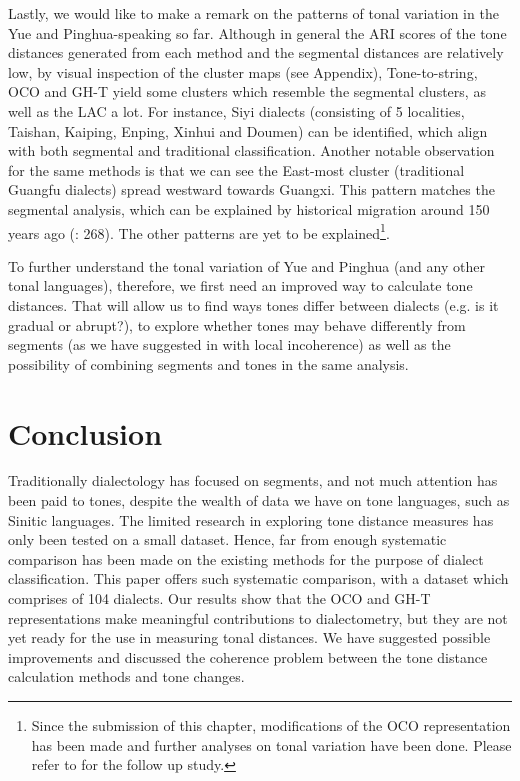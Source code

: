\documentclass[output=paper, chinesefont]{langscibook}
\begin{document}
Lastly, we would like to make a remark on the patterns of tonal variation in the Yue and Pinghua-speaking so far. Although in general the ARI scores of the tone distances generated from each method and the segmental distances are relatively low, by visual inspection of the cluster maps (see Appendix), Tone-to-string, OCO and GH-T yield some clusters which resemble the segmental clusters, as well as the LAC a lot. For instance, Siyi dialects (consisting of 5 localities, Taishan, Kaiping, Enping, Xinhui and Doumen) can be identified, which align with both segmental and traditional classification. Another notable observation for the same methods is that we can see the East-most cluster (traditional Guangfu dialects) spread westward towards Guangxi. This pattern matches the segmental analysis, which can be explained by historical migration around 150 years ago (\citealt{Sousa2022}: 268). The other patterns are yet to be explained\footnote{Since the submission of this chapter, modifications of the OCO representation has been made and further analyses on tonal variation have been done. Please refer to \citet{sung2024exploring} for the follow up study.}.

To further understand the tonal variation of Yue and Pinghua (and any other tonal languages), therefore, we first need an improved way to calculate tone distances. That will allow us to find ways tones differ between dialects (e.g. is it gradual or abrupt?), to explore whether tones may behave differently from segments (as we have suggested in  with local incoherence) as well as the possibility of combining segments and tones in the same analysis.

\section{Conclusion}
\label{sec:sung:7}
Traditionally dialectology has focused on segments, and not much attention has been paid to tones, despite the wealth of data we have on tone languages, such as Sinitic languages. The limited research in exploring tone distance measures has only been tested on a small dataset. Hence, far from enough systematic comparison has been made on the existing methods for the purpose of dialect classification. This paper offers such systematic comparison, with a dataset which comprises of 104 dialects. Our results show that the OCO and GH-T representations make meaningful contributions to dialectometry, but they are not yet ready for the use in measuring tonal distances. We have suggested possible improvements and discussed the coherence problem between the tone distance calculation methods and tone changes.
\end{document}
